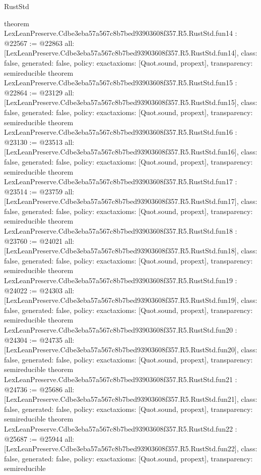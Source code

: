 \begin{lexlean}{RustStd}
\begin{coremodule}
{}
theorem LexLeanPreserve.Cdbe3eba57a567c8b7bed93903608f357.R5.RustStd.fun14 : @22567 := @22863 {
  all: [LexLeanPreserve.Cdbe3eba57a567c8b7bed93903608f357.R5.RustStd.fun14],
  class: false,
  generated: false,
  policy: exact{axioms: [Quot.sound, propext]},
  transparency: semireducible
}
theorem LexLeanPreserve.Cdbe3eba57a567c8b7bed93903608f357.R5.RustStd.fun15 : @22864 := @23129 {
  all: [LexLeanPreserve.Cdbe3eba57a567c8b7bed93903608f357.R5.RustStd.fun15],
  class: false,
  generated: false,
  policy: exact{axioms: [Quot.sound, propext]},
  transparency: semireducible
}
theorem LexLeanPreserve.Cdbe3eba57a567c8b7bed93903608f357.R5.RustStd.fun16 : @23130 := @23513 {
  all: [LexLeanPreserve.Cdbe3eba57a567c8b7bed93903608f357.R5.RustStd.fun16],
  class: false,
  generated: false,
  policy: exact{axioms: [Quot.sound, propext]},
  transparency: semireducible
}
theorem LexLeanPreserve.Cdbe3eba57a567c8b7bed93903608f357.R5.RustStd.fun17 : @23514 := @23759 {
  all: [LexLeanPreserve.Cdbe3eba57a567c8b7bed93903608f357.R5.RustStd.fun17],
  class: false,
  generated: false,
  policy: exact{axioms: [Quot.sound, propext]},
  transparency: semireducible
}
theorem LexLeanPreserve.Cdbe3eba57a567c8b7bed93903608f357.R5.RustStd.fun18 : @23760 := @24021 {
  all: [LexLeanPreserve.Cdbe3eba57a567c8b7bed93903608f357.R5.RustStd.fun18],
  class: false,
  generated: false,
  policy: exact{axioms: [Quot.sound, propext]},
  transparency: semireducible
}
theorem LexLeanPreserve.Cdbe3eba57a567c8b7bed93903608f357.R5.RustStd.fun19 : @24022 := @24303 {
  all: [LexLeanPreserve.Cdbe3eba57a567c8b7bed93903608f357.R5.RustStd.fun19],
  class: false,
  generated: false,
  policy: exact{axioms: [Quot.sound, propext]},
  transparency: semireducible
}
theorem LexLeanPreserve.Cdbe3eba57a567c8b7bed93903608f357.R5.RustStd.fun20 : @24304 := @24735 {
  all: [LexLeanPreserve.Cdbe3eba57a567c8b7bed93903608f357.R5.RustStd.fun20],
  class: false,
  generated: false,
  policy: exact{axioms: [Quot.sound, propext]},
  transparency: semireducible
}
theorem LexLeanPreserve.Cdbe3eba57a567c8b7bed93903608f357.R5.RustStd.fun21 : @24736 := @25686 {
  all: [LexLeanPreserve.Cdbe3eba57a567c8b7bed93903608f357.R5.RustStd.fun21],
  class: false,
  generated: false,
  policy: exact{axioms: [Quot.sound, propext]},
  transparency: semireducible
}
theorem LexLeanPreserve.Cdbe3eba57a567c8b7bed93903608f357.R5.RustStd.fun22 : @25687 := @25944 {
  all: [LexLeanPreserve.Cdbe3eba57a567c8b7bed93903608f357.R5.RustStd.fun22],
  class: false,
  generated: false,
  policy: exact{axioms: [Quot.sound, propext]},
  transparency: semireducible
}
\end{coremodule}
\end{lexlean}
